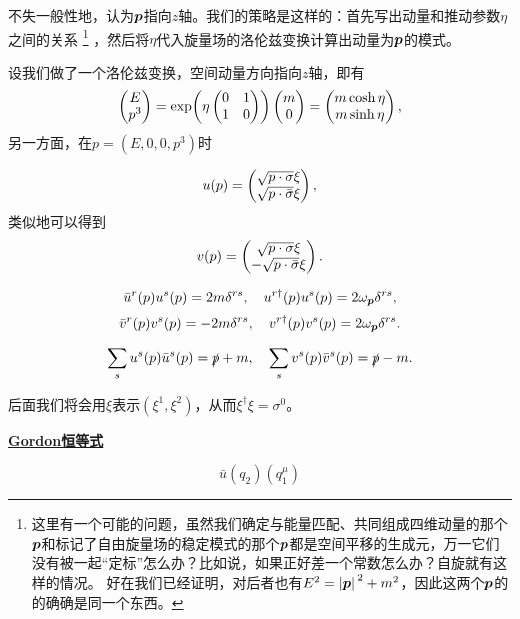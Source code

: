 \documentclass[hyperref, UTF8, a4paper]{ctexart}
\newcommand{\concept}[1]{\underline{\textbf{#1}}}
\begin{document}
不失一般性地，认为$\vb*{p}$指向$z$轴。我们的策略是这样的：首先写出动量和推动参数$\eta$之间的关系%
\footnote{
    这里有一个可能的问题，虽然我们确定与能量匹配、共同组成四维动量的那个$\vb*{p}$和标记了自由旋量场的稳定模式的那个$\vb*{p}$都是空间平移的生成元，万一它们没有被一起“定标”怎么办？比如说，如果正好差一个常数怎么办？自旋就有这样的情况。
    好在我们已经证明，对后者也有$E^2 = \abs*{\vb*{p}}^2 + m^2$，因此这两个$\vb*{p}$的的确确是同一个东西。
}%
，然后将$\eta$代入旋量场的洛伦兹变换计算出动量为$\vb*{p}$的模式。

设我们做了一个洛伦兹变换，空间动量方向指向$z$轴，即有
\[
    \pmqty{E \\ p^3} = \exp(\eta \pmqty{0 & 1 \\ 1 & 0}) \pmqty{m \\ 0} = \pmqty{m \cosh \eta \\ m \sinh \eta},
\]
另一方面，在$p=(E, 0, 0, p^3)$时

\begin{equation}
    u(p) = \pmqty{ \sqrt{p \cdot \sigma} \xi \\ \sqrt{p \cdot \bar{\sigma}} \xi },
\end{equation}
类似地可以得到
\begin{equation}
    v(p) = \pmqty{ \sqrt{p \cdot \sigma} \xi \\ - \sqrt{p \cdot \bar{\sigma}} \xi }.
\end{equation}

\begin{equation}
    \bar{u}^r(p) u^s(p) = 2 m \delta^{rs}, \quad u^{r \dagger}(p) u^s(p) = 2 \omega_{\vb*{p}} \delta^{rs},
\end{equation}
\begin{equation}
    \bar{v}^r(p) v^s(p) = - 2 m \delta^{rs}, \quad v^{r \dagger}(p) v^s(p) = 2 \omega_{\vb*{p}} \delta^{rs}.
\end{equation}

\begin{equation}
    \sum_s u^s(p) \bar{u}^s(p) = \slashed{p} + m, \quad \sum_s v^s(p) \bar{v}^s(p) = \slashed{p} - m.
\end{equation}

后面我们将会用$\xi$表示$(\xi^1, \xi^2)$，从而$\xi^\dagger \xi = \sigma^0$。

\concept{Gordon恒等式}

\begin{equation}
    \bar{u}(q_2) (q_1^\mu )
\end{equation}
\end{document}
